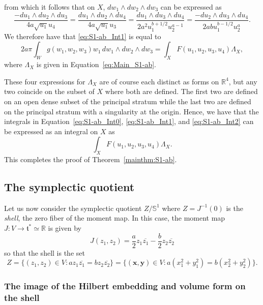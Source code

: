 \documentclass[twoside]{amsart}
\theoremstyle{definition}
\theoremstyle{remark}
\numberwithin{equation}{section}
\newcommand{\Sp}{\mathbb{S}}
\newcommand{\R}{\mathbb{R}}
\begin{document}
from which it follows that on $X$, $dw_1\wedge dw_2 \wedge dw_3$ can be expressed as
\[
    \frac{- du_1\wedge du_2 \wedge du_3}
        {4 a \sqrt{u_1} u_4}
    =
    \frac{du_1\wedge du_2 \wedge du_4}
        {4 a \sqrt{u_1} u_3}
    =
    \frac{du_1\wedge du_3 \wedge du_4}
        {2 a^2 u_1^{b + 1/2} u_2^{a-1}}
    =
    \frac{- du_2\wedge du_3 \wedge du_4}
        {2 a b u_1^{b - 1/2} u_2^a}.
\]
We therefore have that \eqref{eq:S1-ab_Int1} is equal to
\[
    2a\pi \int_W g(w_1, w_2, w_3) w_1 \, dw_1 \wedge dw_2 \wedge dw_3
    =
    \int_X F(u_1, u_2, u_3, u_4) \Lambda_X,
\]
where $\Lambda_X$ is given in Equation~\eqref{eq:Main_S1-ab}.

These four expressions for $\Lambda_X$ are of course each distinct as forms on $\R^4$, but any two coincide on the subset of $X$ where both are defined.
The first two are defined on an open dense subset of the principal stratum while the last two are defined on the principal stratum with a singularity at the origin.
Hence, we have that the integrals in Equation~\eqref{eq:S1-ab_Int0}, \eqref{eq:S1-ab_Int1}, and \eqref{eq:S1-ab_Int2} can be expressed as an integral on $X$ as
\[
    \int_X F(u_1, u_2, u_3, u_4) \Lambda_X.
\]
This completes the proof of Theorem~\ref{mainthm:S1-ab}.


\subsection{The symplectic quotient}
\label{subsec:S1-ab_Symp}

Let us now consider the symplectic quotient $Z/\Sp^1$ where $Z = J^{-1}(0)$ is the \emph{shell}, the zero fiber of the moment map.
In this case, the moment map $J\colon V\to \mathfrak{t}^\ast \simeq \R$ is given by
\[
    J(z_1, z_2) = \frac{a}{2} z_1\overline{z_1} - \frac{b}{2} z_2 \overline{z_2}
\]
so that the shell is the set
\begin{equation}
\label{eq:S1-ab_SympShell}
    Z   =   \{ (z_1, z_2) \in V : a z_1\overline{z_1} = b z_2\overline{z_2} \}
        =   \{ (\mathbf{x}, \mathbf{y}) \in V : a (x_1^2 + y_1^2) = b (x_2^2 + y_2^2) \}.
\end{equation}


\subsubsection{The image of the Hilbert embedding and volume form on the shell}
\label{subsubsec:S1-ab_SympImageHilbDS}
\end{document}
